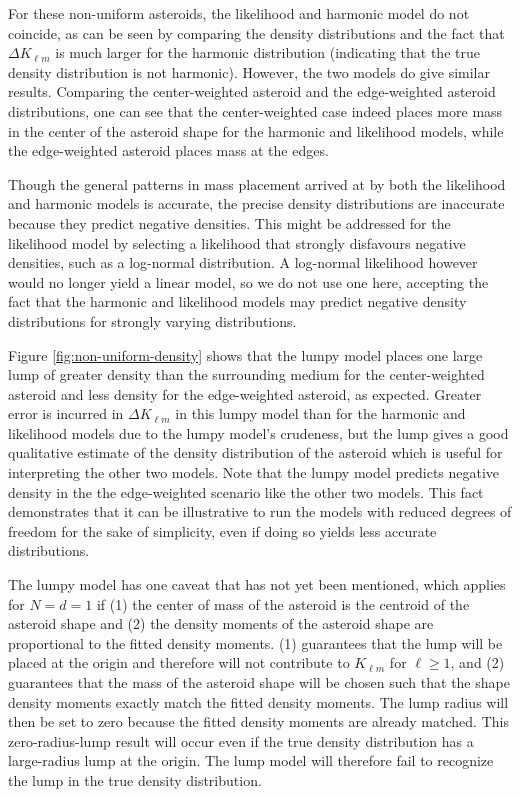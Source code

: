 \documentclass[fleqn,usenatbib]{mnras}
\begin{document}
For these non-uniform asteroids, the likelihood and harmonic model do not coincide, as can be seen by comparing the density distributions and the fact that $\Delta K_{\ell m}$ is much larger for the harmonic distribution (indicating that the true density distribution is not harmonic). However, the two models do give similar results. Comparing the center-weighted asteroid and the edge-weighted asteroid distributions, one can see that the center-weighted case indeed places more mass in the center of the asteroid shape for the harmonic and likelihood models, while the edge-weighted asteroid places mass at the edges.

Though the general patterns in mass placement arrived at by both the likelihood and harmonic models is accurate, the precise density distributions are inaccurate because they predict negative densities. This might be addressed for the likelihood model by selecting a likelihood that strongly disfavours negative densities, such as a log-normal distribution. A log-normal likelihood however would no longer yield a linear model, so we do not use one here, accepting the fact that the harmonic and likelihood models may predict negative density distributions for strongly varying distributions.

Figure \ref{fig:non-uniform-density} shows that the lumpy model places one large lump of greater density than the surrounding medium for the center-weighted asteroid and less density for the edge-weighted asteroid, as expected. Greater error is incurred in $\Delta K_{\ell m}$ in this lumpy model than for the harmonic and likelihood models due to the lumpy model's crudeness, but the lump gives a good qualitative estimate of the density distribution of the asteroid which is useful for interpreting the other two models. Note that the lumpy model predicts negative density in the the edge-weighted scenario like the other two models. This fact demonstrates that it can be illustrative to run the models with reduced degrees of freedom for the sake of simplicity, even if doing so yields less accurate distributions.


The lumpy model has one caveat that has not yet been mentioned, which applies for $N=d=1$ if (1) the center of mass of the asteroid is the centroid of the asteroid shape and (2) the density moments of the asteroid shape are proportional to the fitted density moments. (1) guarantees that the lump will be placed at the origin and therefore will not contribute to $K_{\ell m}$ for $\ell \geq 1$, and (2) guarantees that the mass of the asteroid shape will be chosen such that the shape density moments exactly match the fitted density moments. The lump radius will then be set to zero because the fitted density moments are already matched. This zero-radius-lump result will occur even if the true density distribution has a large-radius lump at the origin. The lump model will therefore fail to recognize the lump in the true density distribution.
\end{document}
